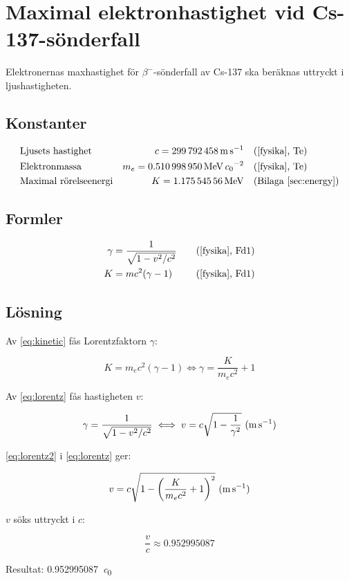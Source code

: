 \section{Maximal elektronhastighet vid Cs-137-sönderfall} \label{sec:speed}

Elektronernas maxhastighet för $\beta^-$-sönderfall av Cs-137 ska beräknas
uttryckt i ljushastigheten.

\subsection{Konstanter}

\begin{align*}
    & \text{Ljusets hastighet}     & c   = \qty{299792458}{\m\per\s}                  &\quad \text{(\cite{fysika}, Te)}   \\
    & \text{Elektronmassa}         & m_e = \qty{0.510998950}{\MeV\per\clight\squared} &\quad \text{(\cite{fysika}, Te)}   \\
    & \text{Maximal rörelseenergi} & K   = \qty{1.17554556}{\MeV}                     &\quad \text{(Bilaga~\ref{sec:energy})}
\end{align*}

\subsection{Formler}

\begin{align}
    \gamma &= \frac{1}{\sqrt{1 - v^2/c^2}} &\quad \text{(\cite{fysika}, Fd1)} \label{eq:lorentz} \\
         K &= mc^2(\gamma - 1)             &\quad \text{(\cite{fysika}, Fd1)} \label{eq:kinetic}
\end{align}

\subsection{Lösning}

Av \eqref{eq:kinetic} fås Lorentzfaktorn $\gamma$:

\begin{equation}
    K = m_e c^2(\gamma - 1) \iff \gamma = \frac{K}{m_e c^2} + 1 \label{eq:lorentz2}
\end{equation}

Av \eqref{eq:lorentz} fås hastigheten $v$:

\begin{equation}
    \gamma = \frac{1}{\sqrt{1 - v^2/c^2}} \iff v = c \sqrt{1 - \frac{1}{\gamma^2}}~\text{(\unit{\m\per\s})} \label{eq:speed}
\end{equation}

\eqref{eq:lorentz2} i \eqref{eq:lorentz} ger:

\begin{equation}
    v = c \sqrt{1 - \left( \frac{K}{m_e c^2} + 1 \right)^2}~\text{(\unit{\m\per\s})}
\end{equation}

$v$ söks uttryckt i $c$:

\begin{equation}
    \frac{v}{c} \approx \num{0.952995087}
\end{equation}

Resultat: \qty{0.952995087}{\clight}
